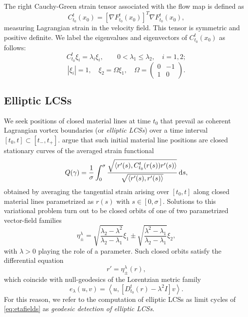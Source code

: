\documentclass{elsarticle}
\begin{document}
The right Cauchy-Green strain tensor associated with the flow map is defined as
\begin{equation}
C_{t_0}^t(x_0) = \left[\nabla F_{t_0}^t(x_0)\right]^T \nabla F_{t_0}^t(x_0),
\label{eq:CG}
\end{equation}
measuring Lagrangian strain in the velocity field. This tensor is symmetric and positive definite\citep{truesdell04}. We label the eigenvalues and eigenvectors of $C_{t_0}^t(x_0)$ as follows:
\[
C_{t_0}^t \xi_i = \lambda_i \xi_i, \qquad 0 < \lambda_1 \leq \lambda_2, \quad i = 1,2;
\]
\begin{equation}
\left|\xi_i\right| = 1, \quad \xi_2 = \Omega \xi_1, \quad \Omega = \left(
\begin{array}{rr}
0 & -1\\
1 & 0
\end{array}
\right).
\label{eq:CG_invariants}
\end{equation}

\subsection{Elliptic LCSs}
\label{sec:Elliptic LCSs}

We seek positions of closed material lines at time $t_0$ that prevail as coherent Lagrangian vortex boundaries (or \emph{elliptic LCSs}) over a time interval $[t_0,t]\subset[t_-,t_+]$. \citet{haller13:_coher_lagran} argue that such initial material line positions are closed stationary curves of the averaged strain functional
\[
Q(\gamma) = \frac{1}{\sigma} \int_0^{\sigma} \frac{\sqrt{\langle r'(s),C_{t_0}^t(r(s))r'(s)\rangle}}{\sqrt{\langle r'(s),r'(s)\rangle}} \dif s,
\]
obtained by averaging the tangential strain arising over $[t_0,t]$ along closed material lines parametrized as $r(s)$ with $s \in [0,\sigma].$
Solutions to this variational problem turn out to be closed orbits of one of two parametrized vector-field families
\begin{equation}
\eta_\pm^\lambda = \sqrt{\frac{\lambda_2 - \lambda^2}{\lambda_2 - \lambda_1}} \xi_1 \pm \sqrt{\frac{\lambda^2 - \lambda_1}{\lambda_2 - \lambda_1}}\xi_2,
\label{eq:eta}
\end{equation}
with $\lambda > 0$ playing the role of a parameter. Such closed orbits satisfy the differential equation
\begin{equation}
r' = \eta_\pm^\lambda(r),
\label{eq:etafields}
\end{equation}
which coincide with null-geodesics of the Lorentzian metric family 
\[
e_\lambda(u,v) = \left\langle u,\left[D_{t_0}^t(r) - \lambda^2 I\right] v \right\rangle.
\]
For this reason, we refer to the computation of elliptic LCSs as limit cycles of \cref{eq:etafields} as \emph{geodesic detection of elliptic LCSs}.
\end{document}
